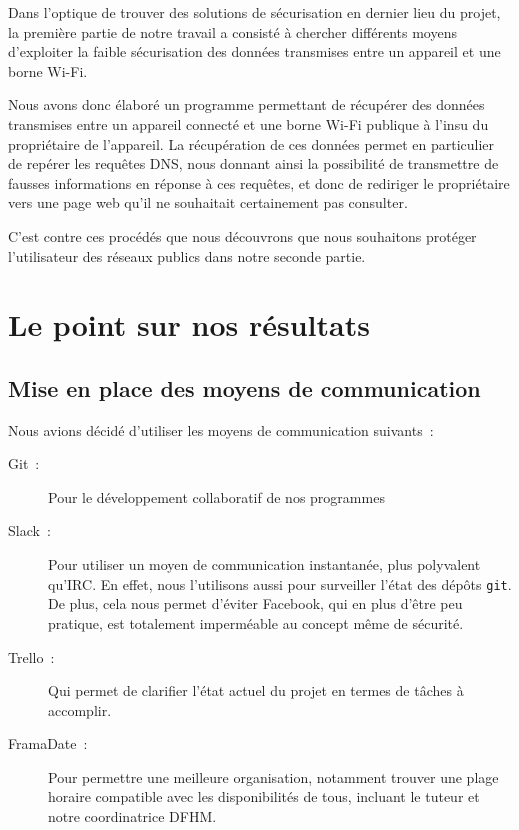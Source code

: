 \documentclass[a4paper, 12pt,twoside]{article}
\begin{document}
        Dans l'optique de trouver des solutions de sécurisation en dernier lieu du projet, la première partie de notre travail a consisté à chercher différents moyens d'exploiter la faible sécurisation des données transmises entre un appareil et une borne Wi-Fi.

        Nous avons donc élaboré un programme permettant de récupérer des données transmises entre un appareil connecté et une borne Wi-Fi publique à l'insu du propriétaire de l'appareil. La récupération de ces données permet en particulier de repérer les requêtes DNS, nous donnant ainsi la possibilité de transmettre de fausses informations en réponse à ces requêtes, et donc de rediriger le propriétaire vers une page web qu'il ne souhaitait certainement pas consulter.

        C'est contre ces procédés que nous découvrons que nous souhaitons protéger l'utilisateur des réseaux publics dans notre seconde partie.

    \clearpage
    \section{Le point sur nos résultats}

        \subsection{Mise en place des moyens de communication}

            Nous avions décidé d'utiliser les moyens de communication suivants~:
            \begin{description}
                \item[Git~:] Pour le développement collaboratif de nos programmes
                \item[Slack~:] Pour utiliser un moyen de communication instantanée, plus polyvalent qu'IRC. En effet, nous l'utilisons aussi pour surveiller l'état des dépôts \verb!git!. De plus, cela nous permet d'éviter Facebook, qui en plus d'être peu pratique, est totalement imperméable au concept même de sécurité.
                \item[Trello~:] Qui permet de clarifier l'état actuel du projet en termes de tâches à accomplir.
                \item[FramaDate~:] Pour permettre une meilleure organisation, notamment trouver une plage horaire compatible avec les disponibilités de tous, incluant le tuteur et notre coordinatrice DFHM.
            \end{description}
\end{document}
